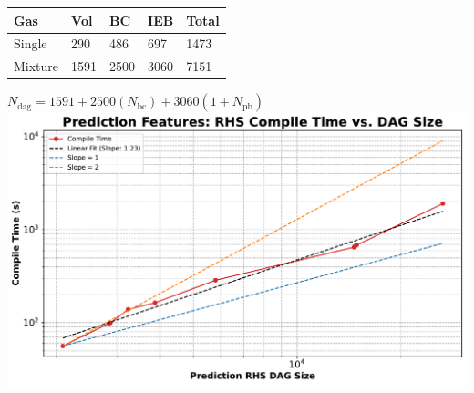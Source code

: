 \begin{frame}
\begin{columns}[T, onlytextwidth]
    \begin{column}{0.48\textwidth}
        \centering
        \begin{tabularx}{\textwidth}{|X|X|X|X|X|}
            \hline
            \textbf{Gas} & \textbf{Vol} & \textbf{BC} & \textbf{IEB} & \textbf{Total} \\ \hline
            Single & 290 & 486 & 697 & 1473 \\ \hline
            Mixture & 1591 & 2500 & 3060 & 7151 \\ \hline
        \end{tabularx}        
        \vspace{5pt}
        $N_{\text{dag}} = 1591 + 2500(N_{\text{bc}}) + 3060(1 + N_{\text{pb}})$\\
        \vfill
        \vspace{20pt}
        \includegraphics[width=\textwidth]{Figures/mtc/compile_dag_scaling.pdf}
    \end{column}
\end{columns}

\end{frame}


